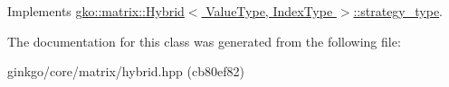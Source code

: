 Implements \hyperlink{classgko_1_1matrix_1_1Hybrid_1_1strategy__type_a0a0cd4024f27c7d0f286f35fc0a6de60}{gko\+::matrix\+::\+Hybrid$<$ Value\+Type, Index\+Type $>$\+::strategy\+\_\+type}.



The documentation for this class was generated from the following file\+:\begin{DoxyCompactItemize}
\item 
ginkgo/core/matrix/hybrid.\+hpp (cb80ef82)\end{DoxyCompactItemize}
